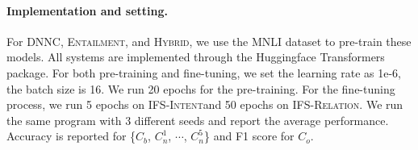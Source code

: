 \documentclass[11pt]{article}
\newcommand{\modelname}{\textsc{Entailment}}
\newcommand{\hybrid}{\textsc{Hybrid}}
\newcommand{\intentdata}{\textsc{IFS-Intent}}
\newcommand{\relationdata}{\textsc{IFS-Relation}}
\begin{document}
\paragraph{Implementation and setting.}
For DNNC, \modelname, and \hybrid , we use the MNLI \cite{williams2018broad} dataset to pre-train these models. 
All systems are implemented through the Huggingface Transformers package.
For both pre-training and fine-tuning, we set the learning rate as 1e-6, the batch size is 16. We run 20 epochs for the pre-training. For the fine-tuning process, we run 5 epochs on \intentdata\enspace and 50 epochs on \relationdata.
We run the same program with 3 different seeds and report the average performance. Accuracy is reported for \{$C_b$, $C_n^1$, $\cdots$, $C_n^5$\} and F1 score for $C_o$.
\end{document}
